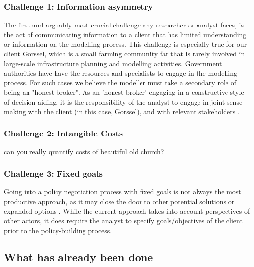 \subsubsection{Challenge 1: Information asymmetry}
The first and arguably most crucial challenge any researcher or analyst faces, is the act of communicating information to a client that has limited understanding or information on the modelling process. This challenge is especially true for our client Gorssel, which is a small farming community far that is rarely involved in large-scale infrastructure planning and modelling activities. Government authorities have have the resources and specialists to engage in the modelling process.
For such cases we believe the modeller must take a secondary role of being an "honest broker". %
As an 'honest broker' engaging in a constructive style of decision-aiding, it is the responsibility of the analyst to engage in joint sense-making with the client (in this case, Gorssel), and with relevant stakeholders \parencite{tsoukias_decision_2008}. 

\subsubsection{Challenge 2: Intangible Costs}
can you really quantify costs of beautiful old church?

\subsubsection{Challenge 3: Fixed goals}
Going into a policy negotiation process with fixed goals is not always the most productive approach, as it may close the door to other potential solutions or expanded options \parencite{de_bruijn_management_2018}. While the current approach takes into account perspectives of other actors, it does require the analyst to specify goals/objectives of the client prior to the policy-building process.

     

\subsection{What has already been done}

